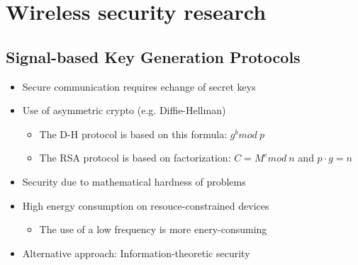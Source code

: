 \chapter{Wireless security research}

\section{Signal-based Key Generation Protocols}
\begin{itemize}
  \item Secure communication requires echange of secret keys
  \item Use of asymmetric crypto (e.g. Diffie-Hellman)
  \begin{itemize}
    \item The D-H protocol is based on this formula: $g^b mod\ p$
    \item The RSA protocol is based on factorization: $C=M^e mod\ n$ and $p
\cdot g = n$
  \end{itemize}
  \item Security due to mathematical hardness of problems
  \item High energy consumption on resouce-constrained devices
  \begin{itemize}
    \item The use of a low frequency is more enery-consuming
  \end{itemize}
  \item Alternative approach: Information-theoretic security
\end{itemize}
